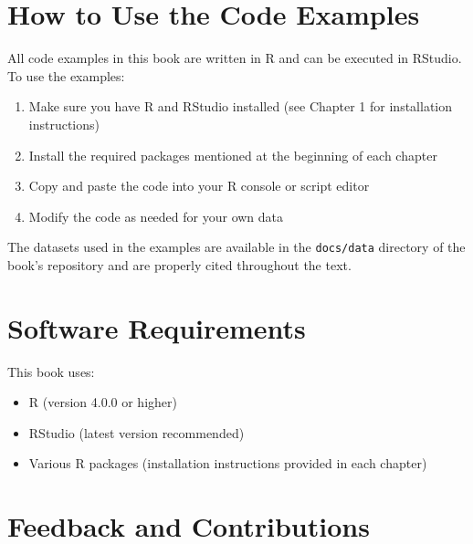 \documentclass[
  letterpaper,
]{book}
\providecommand{\tightlist}{%
  \setlength{\itemsep}{0pt}\setlength{\parskip}{0pt}}
\begin{document}
\section*{How to Use the Code
Examples}\label{how-to-use-the-code-examples}


All code examples in this book are written in R and can be executed in
RStudio. To use the examples:

\begin{enumerate}
\def\labelenumi{\arabic{enumi}.}
\tightlist
\item
  Make sure you have R and RStudio installed (see Chapter 1 for
  installation instructions)
\item
  Install the required packages mentioned at the beginning of each
  chapter
\item
  Copy and paste the code into your R console or script editor
\item
  Modify the code as needed for your own data
\end{enumerate}

The datasets used in the examples are available in the
\texttt{docs/data} directory of the book's repository and are properly
cited throughout the text.

\section*{Software Requirements}\label{software-requirements}


This book uses:

\begin{itemize}
\tightlist
\item
  R (version 4.0.0 or higher)
\item
  RStudio (latest version recommended)
\item
  Various R packages (installation instructions provided in each
  chapter)
\end{itemize}

\section*{Feedback and Contributions}\label{feedback-and-contributions}
\end{document}
